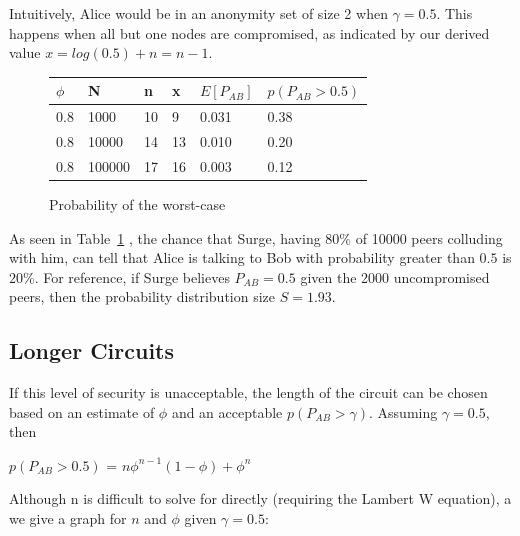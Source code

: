 \documentclass[twocolumn,11pt,english]{article}
\begin{document}
Intuitively, Alice would be in an anonymity set of size 2 when $\gamma = 0.5$. This happens when all but one nodes are compromised, as indicated by our derived value $x = log( 0.5 ) + n = n - 1$. 

\begin{figure}[h]
  \small
  \begin{tabular}{| l | l | l | l | l | l |}

    \hline
    $\phi$ & N & n & x & $E[P_{AB}]$ & $p(P_{AB} > 0.5)$ \\\hline
    0.8 & 1000 & 10 & 9 & 0.031 & 0.38\\
    0.8 & 10000 & 14 & 13 & 0.010 & 0.20\\
    0.8 & 100000 & 17 & 16 & 0.003 & 0.12\\
    \hline
  \end{tabular}
  \caption{Probability of the worst-case}
  \label{WorstCaseTable}
\end{figure}

As seen in Table~\ref{WorstCaseTable} , the chance that Surge, having $80\%$ of 10000 peers colluding with him, can tell that Alice is talking to Bob with probability greater than $0.5$ is $20\%$. For reference, if Surge believes $P_{AB} = 0.5$ given the 2000 uncompromised peers, then the probability distribution size $S = 1.93$. 

\subsection{Longer Circuits}
If this level of security is unacceptable, the length of the circuit can be chosen based on an estimate of $\phi$ and an acceptable $p(P_{AB} > \gamma)$. Assuming $\gamma = 0.5$, then 
\begin{center}
$p(P_{AB} > 0.5)$ = $n\phi^{n-1} (1 - \phi ) + \phi^n $
\end{center}

Although n is difficult to solve for directly (requiring the Lambert W equation), a we give a graph for $n$ and $\phi$ given $\gamma = 0.5$:
\end{document}
